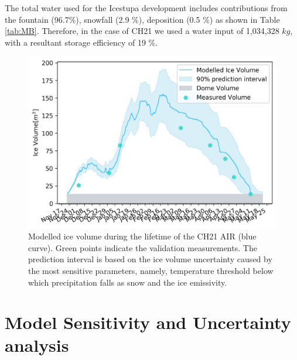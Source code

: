 \documentclass[utf8]{frontiersSCNS} %
\begin{document}
The total water used for the Icestupa development includes contributions from the fountain (96.7\%), snowfall (2.9 \%),
deposition (0.5 \%) as shown in Table \ref{tab:MB}. Therefore, in the case of CH21 we used a water input of 1,034,328
$kg$, with a resultant storage efficiency of 19 \%.

\begin{figure} 
    \begin{center} 
    \includegraphics[width=15 cm]{Figures/uncertainty.jpg} 
\end{center}
  \caption{Modelled ice volume during the lifetime of the CH21 AIR (blue curve). Green points indicate the validation
  measurements. The prediction interval is based on the ice volume uncertainty caused by the most sensitive parameters,
  namely, temperature threshold below which precipitation falls as snow and the ice emissivity.  } 
\label{fig:results} 
\end{figure}


\section{Model Sensitivity and Uncertainty analysis}
\end{document}
